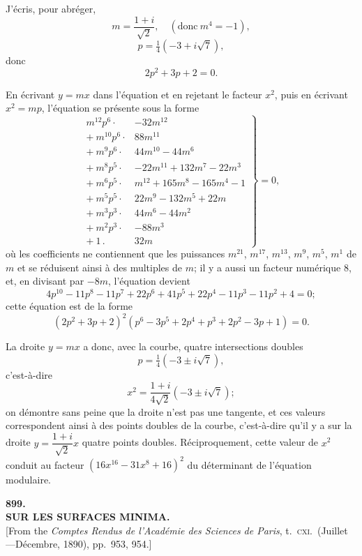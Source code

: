 \documentclass[11pt,a4paper]{article}
\begin{document}
J'\'ecris, pour abr\'eger,
\[
m = \frac{1 + i}{\sqrt{2}},\quad (\text{donc}\ m^4 = -1),
\]
\[
p = \tfrac{1}{4}(-3 + i\sqrt{7}),
\]
donc
\[
2p^2 + 3p + 2 = 0.
\]

En \'ecrivant $y = mx$ dans l'\'equation et en rejetant le facteur $x^2$, puis en \'ecrivant $x^2 = mp$, l'\'equation se pr\'esente sous la forme
\[
\left.\begin{array}{rl}
m^{12} p^6 \cdot & -32 m^{12} \\
+\ m^{10} p^6 \cdot & 88 m^{11} \\
+\ m^9 p^6 \cdot & 44 m^{10} - 44 m^6 \\
+\ m^8 p^5 \cdot & -22 m^{11} + 132 m^7 - 22 m^3 \\
+\ m^6 p^5 \cdot & m^{12} + 165 m^8 - 165 m^4 - 1 \\
+\ m^5 p^5 \cdot & 22 m^9 - 132 m^5 + 22 m \\
+\ m^3 p^3 \cdot & 44 m^6 - 44 m^2 \\
+\ m^2 p^3 \cdot & -88 m^3 \\
+\ 1\,. & 32 m
\end{array}\right\} = 0,
\]
où les coefficients ne contiennent que les puissances $m^{21}$, $m^{17}$, $m^{13}$, $m^9$, $m^5$, $m^1$ de $m$ et se réduisent ainsi à des multiples de $m$; il y a aussi un facteur numérique 8, et, en divisant par $-8m$, l'équation devient
\[
4p^{10} - 11p^8 - 11p^7 + 22p^6 + 41p^5 + 22p^4 - 11p^3 - 11p^2 + 4 = 0;
\]
cette équation est de la forme
\[
(2p^2 + 3p + 2)^2 (p^6 - 3p^5 + 2p^4 + p^3 + 2p^2 - 3p + 1) = 0.
\]

La droite $y = mx$ a donc, avec la courbe, quatre intersections doubles
\[
p = \tfrac{1}{4}(-3 \pm i\sqrt{7}),
\]
c'est-à-dire
\[
x^2 = \frac{1 + i}{4\sqrt{2}}(-3 \pm i\sqrt{7});
\]
on démontre sans peine que la droite n'est pas une tangente, et ces valeurs correspondent ainsi à des points doubles de la courbe, c'est-à-dire qu'il y a sur la droite $y = \dfrac{1 + i}{\sqrt{2}} x$ quatre points doubles. Réciproquement, cette valeur de $x^2$ conduit au facteur $(16x^{16} - 31x^8 + 16)^2$ du déterminant de l'équation modulaire.

\clearpage

\begin{center}
{\large\bfseries 899.}\\[0.5em]
{\large\bfseries SUR LES SURFACES MINIMA.}\\[0.5em]
\small [From the \emph{Comptes Rendus de l'Acad\'emie des Sciences de Paris}, t.\ \textsc{cxi}.\ (Juillet---D\'ecembre, 1890), pp.\ 953, 954.]
\end{center}
\medskip
\end{document}

